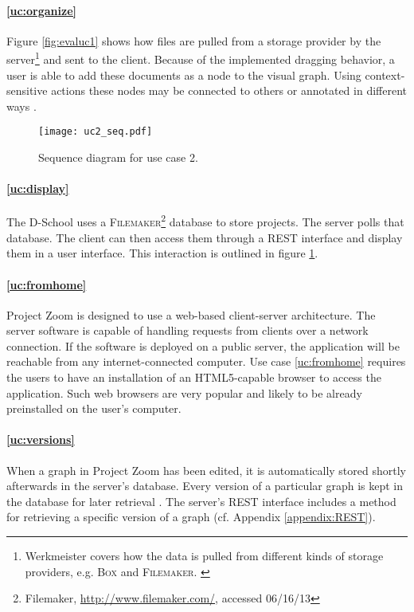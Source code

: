 \paragraph{\ref{uc:organize}} Figure \ref{fig:evaluc1} shows how files are pulled from a storage provider by the server\footnote{Werkmeister covers how the data is pulled from different kinds of storage providers, e.g. \textsc{Box} and \textsc{Filemaker}. \cite{Werkmeister_2013}} and sent to the client. Because of the implemented dragging behavior, a user is able to add these documents as a node to the visual graph. Using context-sensitive actions these nodes may be connected to others or annotated in different ways \cite{Herold_2013}. 

\begin{figure}
\begin{center}
\texttt{[image: uc2\_seq.pdf]}
\caption{Sequence diagram for use case 2.}
\label{fig:evaluc2}
\end{center}
\end{figure}

\paragraph{\ref{uc:display}} The D-School uses a \textsc{Filemaker}\footnote{Filemaker, \url{http://www.filemaker.com/}, accessed 06/16/13} database to store projects. The server polls that database. The client can then access them through a REST interface and display them in a user interface. This interaction is outlined in figure \ref{fig:evaluc2}.

\paragraph{\ref{uc:fromhome}} Project Zoom is designed to use a web-based client-server architecture. The server software is capable of handling requests from clients over a network connection. If the software is deployed on a public server, the application will be reachable from any internet-connected computer. Use case \ref{uc:fromhome} requires the users to have an installation of an HTML5-capable browser to access the application. Such web browsers are very popular and likely to be already preinstalled on the user's computer.

\paragraph{\ref{uc:versions}} When a graph in Project Zoom has been edited, it is automatically stored shortly afterwards in the server's database. Every version of a particular graph is kept in the database for later retrieval \cite{Bocklisch_2013}. The server's REST interface includes a method for retrieving a specific version of a graph (cf. Appendix \ref{appendix:REST}).

